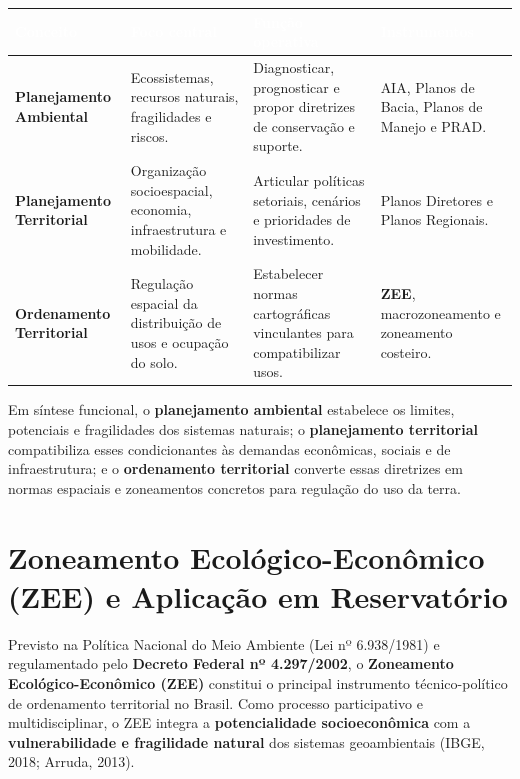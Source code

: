 \begin{center}
\renewcommand{\arraystretch}{1.20}
\small
\begin{tabularx}{\textwidth}{@{}p{2.9cm} >{\raggedright\arraybackslash}X >{\raggedright\arraybackslash}X p{3.0cm}@{}}
  \toprule
  \rowcolor{uefsNavy}
  \textcolor{white}{\bfseries Conceito} & \textcolor{white}{\bfseries Foco central} & \textcolor{white}{\bfseries Função operativa} & \textcolor{white}{\bfseries Instrumentos} \\
  \midrule
  \textbf{Planejamento Ambiental} & Ecossistemas, recursos naturais, fragilidades e riscos. & Diagnosticar, prognosticar e propor diretrizes de conservação e suporte. & AIA, Planos de Bacia, Planos de Manejo e PRAD. \\
  \rowcolor{bgGray}
  \textbf{Planejamento Territorial} & Organização socioespacial, economia, infraestrutura e mobilidade. & Articular políticas setoriais, cenários e prioridades de investimento. & Planos Diretores e Planos Regionais. \\
  \textbf{Ordenamento Territorial} & Regulação espacial da distribuição de usos e ocupação do solo. & Estabelecer normas cartográficas vinculantes para compatibilizar usos. & \textbf{ZEE}, macrozoneamento e zoneamento costeiro. \\
  \bottomrule
\end{tabularx}
\end{center}

Em síntese funcional, o \textbf{planejamento ambiental} estabelece os limites, potenciais e fragilidades dos sistemas naturais; o \textbf{planejamento territorial} compatibiliza esses condicionantes às demandas econômicas, sociais e de infraestrutura; e o \textbf{ordenamento territorial} converte essas diretrizes em normas espaciais e zoneamentos concretos para regulação do uso da terra.

\section{Zoneamento Ecológico-Econômico (ZEE) e Aplicação em Reservatório}

Previsto na Política Nacional do Meio Ambiente (Lei nº 6.938/1981) e regulamentado pelo \textbf{Decreto Federal nº 4.297/2002}, o \textbf{Zoneamento Ecológico-Econômico (ZEE)} constitui o principal instrumento técnico-político de ordenamento territorial no Brasil. Como processo participativo e multidisciplinar, o ZEE integra a \textbf{potencialidade socioeconômica} com a \textbf{vulnerabilidade e fragilidade natural} dos sistemas geoambientais (IBGE, 2018; Arruda, 2013).

